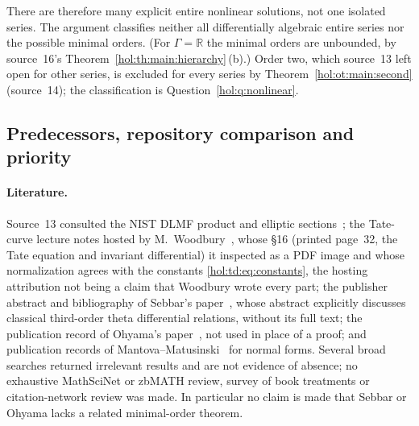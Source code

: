 \documentclass[11pt]{article}
\numberwithin{equation}{section}
\theoremstyle{definition}
\theoremstyle{remark}
\newcommand{\R}{\mathbb R}
\begin{document}
There are therefore many explicit entire nonlinear solutions, not one isolated
series. The argument classifies neither all differentially algebraic entire
series nor the possible minimal orders. (For $\Gamma=\R$ the minimal orders
are unbounded, by source~16's Theorem~\ref{hol:th:main:hierarchy}\,(b).) Order two, which source~13 left open
for other series, is excluded for every series by
Theorem~\ref{hol:ot:main:second} (source~14); the classification is
Question~\ref{hol:q:nonlinear}.

\subsection{Predecessors, repository comparison and priority}
\label{hol:td:sub:predecessors}

\paragraph{Literature.}
Source~13 consulted the NIST DLMF product and elliptic
sections~\cite{dlmftheta,dlmfelliptic}; the Tate-curve lecture notes hosted by
M.~Woodbury~\cite{woodbury}, whose \S16 (printed page~32, the Tate equation
and invariant differential) it inspected as a PDF image and whose
normalization agrees with the constants \eqref{hol:td:eq:constants}, the
hosting attribution not being a claim that Woodbury wrote every part; the
publisher abstract and bibliography of Sebbar's paper~\cite{sebbar}, whose
abstract explicitly discusses classical third-order theta differential
relations, without its full text; the publication record of Ohyama's
paper~\cite{ohyama}, not used in place of a proof; and publication records of
Mantova--Matusinski~\cite{mantovamatusinski} for normal forms. Several broad
searches returned irrelevant results and are not evidence of absence; no
exhaustive MathSciNet or zbMATH review, survey of book treatments or
citation-network review was made. In particular no claim is made that Sebbar
or Ohyama lacks a related minimal-order theorem.
\end{document}
